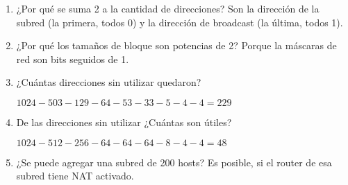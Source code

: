 \begin{enumerate}[start=2]
    \item ¿Por qué se suma 2 a la cantidad de direcciones? Son la dirección de la subred (la primera, todos 0) y la dirección de broadcast (la última, todos 1).

    \item ¿Por qué los tamaños de bloque son potencias de 2? Porque la máscaras de red son bits seguidos de 1.

    \item ¿Cuántas direcciones sin utilizar quedaron?
    
    \hfil$1024 - 503 - 129 - 64 - 53 - 33 - 5 - 4 - 4 = 229$\hfil

    \item De las direcciones sin utilizar ¿Cuántas son útiles?
    
    \hfil$1024 - 512 - 256 - 64 - 64 - 64 - 8 - 4 - 4 = 48$\hfil

    \item ¿Se puede agregar una subred de 200 hosts? Es posible, si el router de esa subred tiene NAT activado.

\end{enumerate}